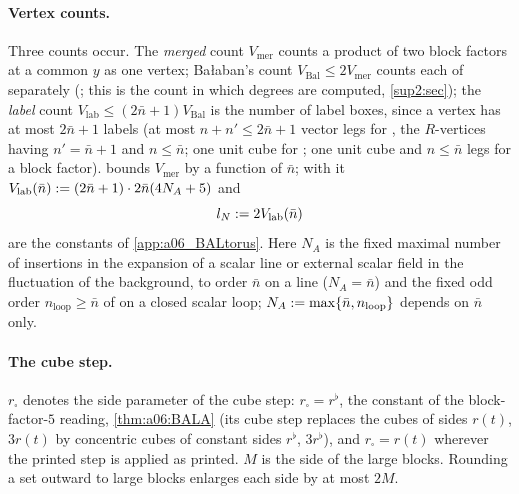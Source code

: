 \paragraph{Vertex counts.} Three counts occur. The \emph{merged} count $V_{\mathrm{mer}}$ counts a product \cite[(1.18)]{Ba3} of two block factors at a common $y$ as one vertex; Ba{\l}aban's count $V_{\mathrm{Bal}}\le2V_{\mathrm{mer}}$ counts each of \cite[(1.13)--(1.15)]{Ba3} separately (\cite[p.~414]{Ba3}; this is the count in which degrees are computed, \cref{sup2:sec}); the \emph{label} count $V_{\mathrm{lab}}\le(2\bar n+1)V_{\mathrm{Bal}}$ is the number of label boxes, since a vertex has at most $2\bar n+1$ labels (at most $n+n'\le2\bar n+1$ vector legs for \cite[(1.8)--(1.11)]{Ba3}, the $R$-vertices having $n'=\bar n+1$ and $n\le\bar n$; one unit cube for \cite[(1.6)--(1.7)]{Ba3}; one unit cube and $n\le\bar n$ legs for a block factor).  bounds $V_{\mathrm{mer}}$ by a function of $\bar n$; with it $V_{\mathrm{lab}}(\bar n):=(2\bar n+1)\cdot2\bar n(4N_A+5)$ and
\[
l_N:=2V_{\mathrm{lab}}(\bar n)
\]
are the constants of \cref{app:a06_BALtorus}. Here $N_A$ is the fixed maximal number of insertions in the expansion of a scalar line or external scalar field in the fluctuation of the background, \cite[(3.45)]{Ba1} to order $\bar n$ on a line ($N_A=\bar n$) and the fixed odd order $n_{\mathrm{loop}}\ge\bar n$ of \cite[(3.47)]{Ba1} on a closed scalar loop; $N_A:=\max\{\bar n,n_{\mathrm{loop}}\}$ depends on $\bar n$ only.

\paragraph{The cube step.} $r_\square$ denotes the side parameter of the cube step: $r_\square=r^\flat$, the constant of the block-factor-$5$ reading, \cref{thm:a06:BALA} (its cube step replaces the cubes of sides $r(t)$, $3r(t)$ by concentric cubes of constant sides $r^\flat$, $3r^\flat$), and $r_\square=r(t)$ wherever the printed step is applied as printed. $M$ is the side of the large blocks. Rounding a set outward to large blocks enlarges each side by at most $2M$.
